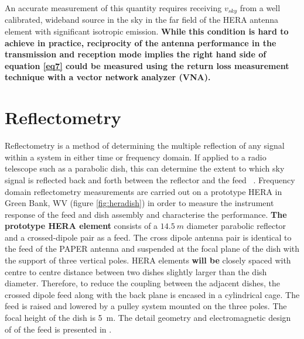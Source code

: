 \documentclass[twocolumn]{emulateapj}
\newcommand{\volt}{{v}}
\newcommand{\dfngexp}{{e^{2\pi i\nu \Delta \tau}}}
\begin{document}
    
    An accurate measurement of this quantity requires receiving $v_{sky}$ from a
    well calibrated, wideband source in the sky in the far field of the HERA
    antenna element with significant isotropic emission. \textbf{While this condition is
    hard to achieve in practice, reciprocity of the antenna performance
    in the transmission and reception mode implies the right hand side of equation
    \ref{eq7} could be measured using the return loss measurement technique with a
    vector network analyzer (VNA).} \\
    \section{\textbf{Reflectometry}} 
    Reflectometry is a method of determining the multiple reflection of any signal within 
    a system in either time or frequency domain. If applied to a radio telescope such as
     a parabolic dish, this can determine the extent to which 
    sky signal is reflected back and forth between the reflector and the feed ~\citep{2015arXiv150205862P}.
    Frequency domain reflectometry measurements are carried out on a prototype HERA in
    Green Bank, WV (figure \ref{fig:heradish}) in order to measure the instrument
    response of the feed and dish assembly and characterise the performance.  \textbf{The prototype HERA
    element} consists of a $14.5~m$ diameter parabolic reflector and a
    crossed-dipole pair as a feed. The cross dipole antenna pair is identical to
    the feed of the PAPER antenna and suspended at the focal plane of the dish
    with the support of three vertical poles. HERA elements \textbf{will be} closely spaced with
    centre to centre distance between two dishes slightly larger than the dish diameter.
    Therefore, to reduce the coupling between the adjacent dishes, the crossed
    dipole feed along with the back plane is encased in a cylindrical cage. The
    feed is raised and lowered by a pulley system mounted on the three poles.
    The focal height of the dish is 5~m.  The detail geometry and electromagnetic
    design of of the feed is presented in \cite{ddboer_et_al2016}. \\
    
\end{document}
